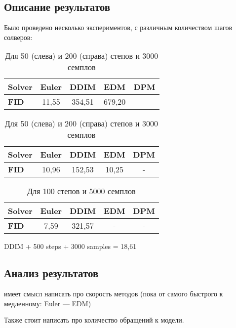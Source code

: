 \documentclass[a4paper]{article}
\begin{document}
    \subsection{Описание результатов}
    Было проведено несколько экспериментов, с различным количеством шагов солверов:
    \begin{table}
        \centering
        \begin{tabular}{ l | c | c | c | c }
            \textbf{Solver} & Euler & DDIM  & EDM   & DPM \\ \hline
            \textbf{FID}    & 11{,}55 & 354{,}51 & 679{,}20   & -
        \end{tabular}\hspace{50pt}%
        \begin{tabular}{ l | c | c | c | c }
            \textbf{Solver} & Euler & DDIM  & EDM   & DPM \\ \hline
            \textbf{FID}    & 10{,}96 & 152{,}53 & 10{,}25 & -
        \end{tabular}
        \caption{Для 50 (слева) и 200 (справа) степов и 3000 семплов}
    \end{table}
    \begin{table}
        \centering
        \begin{tabular}{ l | c | c | c | c }
            \textbf{Solver} & Euler & DDIM  & EDM   & DPM \\ \hline
            \textbf{FID}    & 7{,}59 & 321{,}57 & -   & -
        \end{tabular}
        \caption{Для 100 степов и 5000 семплов}
    \end{table}
    DDIM + 500 steps + 3000 samples = 18{,}61

    \subsection{Анализ результатов}
    
    имеет смысл написать про скорость методов (пока от самого быстрого к медленному:
    Euler --- EDM)

    Также стоит написать про количество обращений к модели.
\end{document}
